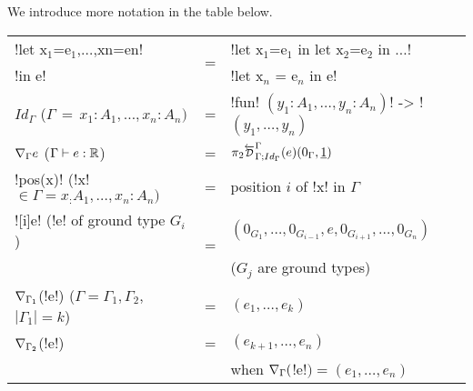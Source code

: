 \begin{notation}
We introduce more notation in the table below.\\

\begin{tabular}{|l c l|}
    \hline
    !let x$_{1}$=e$_{1}$,$\ldots$,xn=en!  & \multirow{2}{*}{=} & !let x$_{1}$=e$_{1}$ in let x$_{2}$=e$_{2}$ in $\ldots$! \\
    !in e! && !let x$_n$ = e$_n$ in e!\\ \hline
    $Id_\Gamma$ \quad\quad\quad ($\Gamma \, = \, x_1:A_1,\ldots,x_n:A_n)$ & = & !fun! $(y_1:A_1,\ldots,y_n:A_n)$! -> !$(y_1,\ldots,y_n)$ \\ \hline
    $\nabla_\Gamma e$ \quad\quad\hspace{0.6em}($\Gamma\vdash e:\mathbb{R}$) & = & $\pi_2\directD{\Gamma}{\Gamma}{Id_\Gamma}(e)(0_\Gamma,\underline{1})$ \\ \hline
    !pos(x)! \quad(!x!$\in\Gamma=x_:A_1,\ldots,x_n:A_n)$ & = & position $i$ of !x! in $\Gamma$ \\ \hline
    ![i]e! \quad\quad(!e! of ground type $G_i$) & \multirow{2}{*}{=} &  $(0_{G_1},\ldots,0_{G_{i-1}},e,0_{G_{i+1}},\ldots,0_{G_n})$ \\
    && ($G_j$ are ground types) \\ \hline
    $\nabla_{\Gamma_1}$(!e!) \quad\quad($\Gamma=\Gamma_1,\Gamma_2$, $|\Gamma_1|=k$)& = & $(e_1,\ldots,e_k)$ \\
    $\nabla_{\Gamma_2}$(!e!) & = & $(e_{k+1},\ldots,e_n)$ \\
    && when $\nabla_{\Gamma}($!e!$) = (e_1,\ldots,e_n)$ \\ \hline
\end{tabular}
\end{notation}

